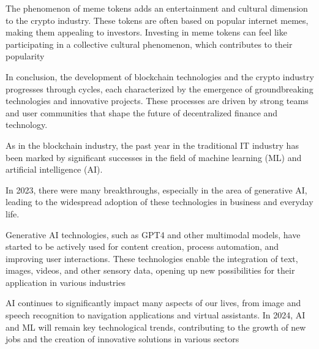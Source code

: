 \documentclass[a4paper,12pt,english]{sphinxmanual}
\begin{document}
\sphinxAtStartPar
The phenomenon of meme tokens adds an entertainment and cultural
dimension to the crypto industry. These tokens are often based on
popular internet memes, making them appealing to investors. Investing in
meme tokens can feel like participating in a collective cultural
phenomenon, which contributes to their popularity %
\begin{footnote}[5]\sphinxAtStartFootnote
{}
%
\end{footnote}

\sphinxAtStartPar
In conclusion, the development of blockchain technologies and the crypto
industry progresses through cycles, each characterized by the emergence
of groundbreaking technologies and innovative projects. These processes
are driven by strong teams and user communities that shape the future of
decentralized finance and technology.

\sphinxAtStartPar
As in the blockchain industry, the past year in the traditional IT
industry has been marked by significant successes in the field of
machine learning (ML) and artificial intelligence (AI).

\sphinxAtStartPar
In 2023, there were many breakthroughs, especially in the area of
generative AI, leading to the widespread adoption of these technologies
in business and everyday life.

\sphinxAtStartPar
{}

\sphinxAtStartPar
Generative AI technologies, such as GPT\sphinxhyphen{}4 and other multimodal models,
have started to be actively used for content creation, process
automation, and improving user interactions. These technologies enable
the integration of text, images, videos, and other sensory data, opening
up new possibilities for their application in various industries %
\begin{footnote}[6]\sphinxAtStartFootnote
{}
%
\end{footnote}

\sphinxAtStartPar
{}

\sphinxAtStartPar
AI continues to significantly impact many aspects of our lives, from
image and speech recognition to navigation applications and virtual
assistants. In 2024, AI and ML will remain key technological trends,
contributing to the growth of new jobs and the creation of innovative
solutions in various sectors %
\begin{footnote}[7]\sphinxAtStartFootnote
{}
%
\end{footnote}
\end{document}

